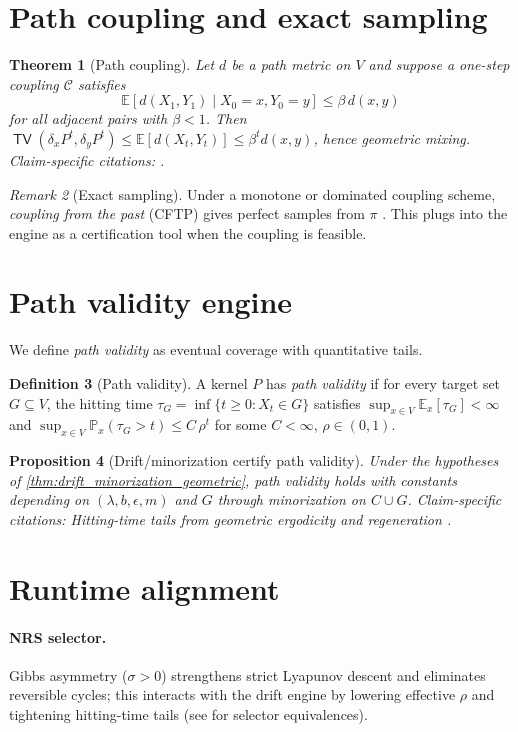 \documentclass[11pt]{article}
\theoremstyle{plain}
\newtheorem{theorem}{Theorem}[section]
\newtheorem{proposition}[theorem]{Proposition}
\theoremstyle{definition}
\newtheorem{definition}[theorem]{Definition}
\theoremstyle{remark}
\newtheorem{remark}[theorem]{Remark}
\DeclareMathOperator{\TV}{\mathsf{TV}}
\newcommand{\EE}{\mathbb{E}}
\newcommand{\PP}{\mathbb{P}}
\newcommand{\1}{\mathds{1}}
\newcommand{\EP}{\sigma}
\begin{document}
\section{Path coupling and exact sampling}
\begin{theorem}[Path coupling]\label{thm:path_coupling}
Let $d$ be a path metric on $V$ and suppose a one-step coupling $\mathcal{C}$ satisfies
\[
\EE[d(X_1,Y_1)\mid X_0=x,Y_0=y]\le \beta\,d(x,y)
\]
for all adjacent pairs with $\beta<1$. Then $\TV(\delta_x P^t,\delta_y P^t)\le \EE[d(X_t,Y_t)]\le \beta^t d(x,y)$, hence geometric mixing.
\textit{Claim-specific citations:} \cite{BubleyDyer1997,LevinPeresWilmer2009}.
\end{theorem}

\begin{remark}[Exact sampling]
Under a monotone or dominated coupling scheme, \emph{coupling from the past} (CFTP) gives perfect samples from $\pi$ \cite{ProppWilson1996}. This plugs into the engine as a certification tool when the coupling is feasible.
\end{remark}

\section{Path validity engine}
We define \emph{path validity} as eventual coverage with quantitative tails.

\begin{definition}[Path validity]
A kernel $P$ has \emph{path validity} if for every target set $G\subseteq V$, the hitting time $\tau_G=\inf\{t\ge 0:X_t\in G\}$ satisfies $\sup_{x\in V}\EE_x[\tau_G]<\infty$ and $\sup_{x\in V}\PP_x(\tau_G>t)\le C\,\rho^t$ for some $C<\infty$, $\rho\in(0,1)$.
\end{definition}

\begin{proposition}[Drift/minorization certify path validity]
Under the hypotheses of \cref{thm:drift_minorization_geometric}, path validity holds with constants depending on $(\lambda,b,\epsilon,m)$ and $G$ through minorization on $C\cup G$.
\textit{Claim-specific citations:} Hitting-time tails from geometric ergodicity and regeneration \cite{MeynTweedie2009,RobertsRosenthal2004}.
\end{proposition}

\section{Runtime alignment}
\paragraph{NRS selector.} Gibbs asymmetry ($\EP>0$) strengthens strict Lyapunov descent and eliminates reversible cycles; this interacts with the drift engine by lowering effective $\rho$ and tightening hitting-time tails (see \cite{NRSinPrep2025} for selector equivalences).
\end{document}
